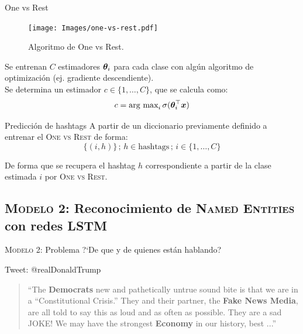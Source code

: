\documentclass[10pt]{beamer}
\begin{document}
\begin{frame}{One vs Rest}
  \noindent\begin{minipage}{0.5\textwidth}
    \begin{figure}[H]
      \centering
      \texttt{[image: Images/one-vs-rest.pdf]}
      \caption[Algoritmo de One vs Rest]{Algoritmo de One vs Rest.}
      \label{fig:ovr-algo}
    \end{figure}
  \end{minipage}%
  \hfill%
  \begin{minipage}{0.45\textwidth}
    Se entrenan $C$ estimadores ${\bm{\theta}}_i$ para cada clase con algún algoritmo de optimización (ej. gradiente descendiente). \\
    
    Se determina un estimador $c \in \{1, \ldots ,C\}$, que se calcula como:
    \begin{equation*}
      c = \text{arg max}_i \, \sigma({\bm{\theta}}_i^{\top} {\bm{x}})
    \end{equation*}
  \end{minipage}
\end{frame}

\begin{frame}{Predicción de hashtags}
  A partir de un diccionario previamente definido a entrenar el \textsc{One vs Rest} de forma:
  \begin{equation*}
    \{(i, h)\} \,;\, h \in \text{hashtags} \,;\, i \in \{1, \ldots, C\}
  \end{equation*}

  De forma que se recupera el hashtag $h$ correspondiente a partir de la clase estimada $i$ por \textsc{One vs Rest}.
\end{frame}

\subsection{\textsc{Modelo 2:} Reconocimiento de \textsc{Named Entities} con redes \textsc{LSTM}}

\begin{frame}{\textsc{Modelo 2:} Problema}
  \alert{?`De que y de quienes están hablando?}
  
\begin{alertblock}{Tweet: @realDonaldTrump}
  \begin{quote}
    ``The \textbf{Democrats} new and pathetically untrue sound bite is that we are in a “Constitutional Crisis.” They and their partner, the \textbf{Fake News Media}, are all told to say this as loud and as often as possible. They are a sad JOKE! We may have the strongest \textbf{Economy} in our history, best ...''
  \end{quote}
\end{alertblock}
\end{frame}
\end{document}
